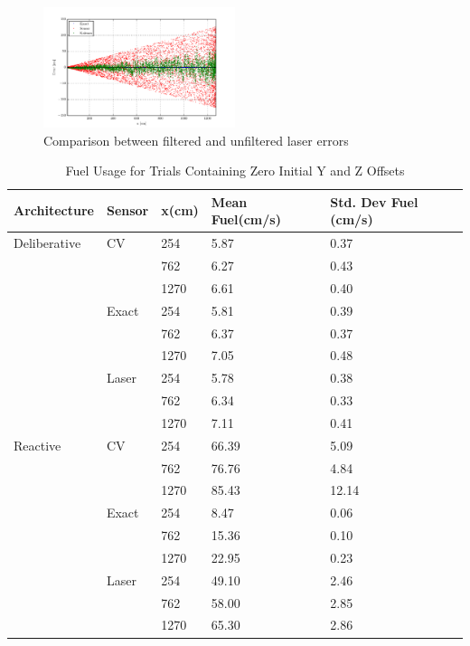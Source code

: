 \documentclass[journal, 10pt]{IEEEtran}
\begin{document}
\begin{figure}
\begin{center}
\includegraphics[width=0.5\textwidth]{figures/lasererror.pdf}
\caption{Comparison between filtered and unfiltered laser errors}
\label{laser_error}
\end{center}
\end{figure}

\begin{table}
\centering
\normalsize
\caption{Fuel Usage for Trials Containing Zero Initial Y and Z Offsets}
\begin{tabular}{lllll}
\toprule
Architecture & Sensor & x(cm) & Mean Fuel(cm/s) & Std. Dev Fuel (cm/s)\\
\midrule
Deliberative & CV & 254  & 5.87 & 0.37 \\
                & & 762  & 6.27 & 0.43 \\
                & & 1270 & 6.61 & 0.40 \\
          & Exact & 254  & 5.81 & 0.39 \\
                & & 762  & 6.37 & 0.37 \\
                & & 1270 & 7.05 & 0.48 \\
          & Laser & 254  & 5.78 & 0.38 \\
                & & 762  & 6.34 & 0.33 \\
                & & 1270 & 7.11 & 0.41 \\
\cmidrule(lr) {1-5}
Reactive & CV &     254  & 66.39 &  5.09\\
                & & 762  & 76.76 &  4.84\\
                & & 1270 & 85.43 & 12.14\\
        & Exact   & 254  &  8.47 &  0.06\\
                & & 762  & 15.36 &  0.10\\
                & & 1270 & 22.95 &  0.23\\
        & Laser   & 254  & 49.10 &  2.46\\
                & & 762  & 58.00 &  2.85\\
                & & 1270 & 65.30 &  2.86\\
\bottomrule
\end{tabular}
\label{initial}
\end{table}
\end{document}
